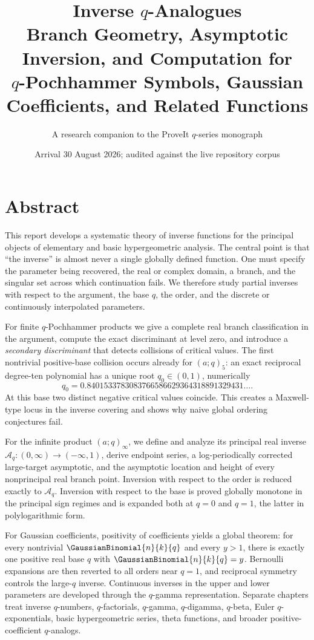 \documentclass[11pt,oneside]{article}
\title{\bfseries Inverse \(q\)-Analogues\\[0.4em]
\large Branch Geometry, Asymptotic Inversion, and Computation for\\
\(q\)-Pochhammer Symbols, Gaussian Coefficients, and Related Functions}
\author{A research companion to the ProveIt \(q\)-series monograph}
\date{Arrival 30 August 2026; audited against the live repository corpus}
\theoremstyle{definition}
\theoremstyle{remark}
\theoremstyle{plain}
\theoremstyle{definition}
\theoremstyle{remark}
\newcommand{\Aq}{\mathcal A_q}
\numberwithin{equation}{section}
\numberwithin{figure}{section}
\numberwithin{table}{section}
\let\reporttopsection\section
\let\reportsubsection\subsection
\let\reportsubsubsection\subsubsection
\let\chapter\reporttopsection
\let\section\reportsubsection
\let\subsection\reportsubsubsection
\providecommand{\frontmatter}{}
\begin{document}
\frontmatter
\hypersetup{pageanchor=false}
\maketitle
\clearpage
\hypersetup{pageanchor=true}

\chapter*{Abstract}
This report develops a systematic theory of inverse functions for the principal
objects of elementary and basic hypergeometric analysis.  The central point is
that ``the inverse'' is almost never a single globally defined function.  One
must specify the parameter being recovered, the real or complex domain, a
branch, and the singular set across which continuation fails.  We therefore
study partial inverses with respect to the argument, the base \(q\), the order,
and the discrete or continuously interpolated parameters.

For finite \(q\)-Pochhammer products we give a complete real branch
classification in the argument, compute the exact discriminant at level zero,
and introduce a \emph{secondary discriminant} that detects collisions of
critical values.  The first nontrivial positive-base collision occurs already
for \((a;q)_5\): an exact reciprocal degree-ten polynomial has a unique root
\(q_0\in(0,1)\), numerically
\[
 q_0=0.8401533783083766586629364318891329431\ldots .
\]
At this base two distinct negative critical values coincide.  This creates a
Maxwell-type locus in the inverse covering and shows why naive global ordering
conjectures fail.

For the infinite product \((a;q)_\infty\), we define and analyze its principal
real inverse \(\Aq:(0,\infty)\to(-\infty,1)\), derive endpoint series, a
log-periodically corrected large-target asymptotic, and the asymptotic location
and height of every nonprincipal real branch point.  Inversion with respect to
the order is reduced exactly to \(\Aq\).  Inversion with respect to the base is
proved globally monotone in the principal sign regimes and is expanded both at
\(q=0\) and \(q=1\), the latter in polylogarithmic form.

For Gaussian coefficients, positivity of coefficients yields a global theorem:
for every nontrivial \(\GaussianBinomial{n}{k}{q}\) and every \(y>1\), there is exactly one
positive real base \(q\) with \(\GaussianBinomial{n}{k}{q}=y\).  Bernoulli expansions are then
reverted to all orders near \(q=1\), and reciprocal symmetry controls the
large-\(q\) inverse.  Continuous inverses in the upper and lower parameters are
developed through the \(q\)-gamma representation.  Separate chapters treat
inverse \(q\)-numbers, \(q\)-factorials, \(q\)-gamma, \(q\)-digamma,
\(q\)-beta, Euler \(q\)-exponentials, basic hypergeometric series, theta
functions, and broader positive-coefficient \(q\)-analogs.
\end{document}
